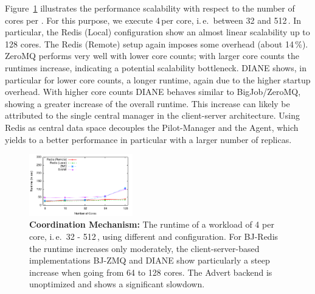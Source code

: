 \documentclass[conference]{IEEEtran}
\begin{document}
Figure~\ref{fig:perf_bigjob-varying-cores} illustrates the performance
scalability with respect to the number of cores per \pilot. For this purpose,
we execute 4\,\cus per core, i.\,e.\ between 32 and 512\,\cus. In particular,
the Redis (Local) configuration show an almost linear scalability up to 128
cores. The Redis (Remote) setup again imposes some overhead (about 14\,\%).
ZeroMQ performs very well with lower core counts; with larger core counts the
runtimes increase, indicating a potential scalability bottleneck. DIANE shows,
in particular for lower core counts, a longer runtime, again due to the higher
startup overhead. With higher core counts DIANE behaves similar to
BigJob/ZeroMQ, showing a greater increase of the overall runtime. This
increase can likely be attributed to the single central manager in the
client-server architecture. Using Redis as central data space decouples the 
Pilot-Manager and the Agent, which yields to a better performance in 
particular with a larger number of replicas.



\begin{figure}[t] 
 \centering
 \up
 \includegraphics[width=0.4\textwidth]{../perf/bigjob-varying-cores-alamo-noadvert.pdf}
 \up
 \caption{\textbf{\pilotjob Coordination Mechanism:}  The
  runtime of a workload of 4 \cus per core, i.\,e.\ 32 - 512\,\cus, using 
different \pilots and configuration. For 
BJ-Redis the runtime  increases only moderately, the client-server-based 
implementations BJ-ZMQ and DIANE show particularly a steep increase when going 
from 64 to 128 cores. The Advert backend is unoptimized and 
shows a significant slowdown. \up\up
  }
 \label{fig:perf_bigjob-varying-cores} 
\end{figure}
\end{document}

